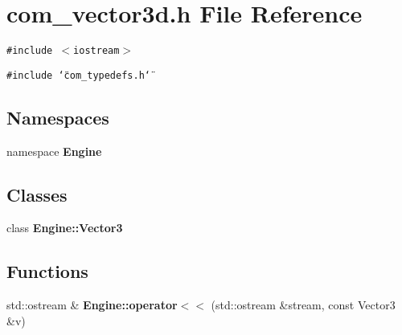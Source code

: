 \section{com\_\-vector3d.h File Reference}
\label{com__vector3d_8h}
{\tt \#include $<$iostream$>$}\par
{\tt \#include \char`\"{}com\_\-typedefs.h\char`\"{}}\par
\subsection*{Namespaces}
\begin{CompactItemize}
\item 
namespace {\bf Engine}
\end{CompactItemize}
\subsection*{Classes}
\begin{CompactItemize}
\item 
class {\bf Engine::Vector3}
\end{CompactItemize}
\subsection*{Functions}
\begin{CompactItemize}
\item 
std::ostream \& {\bf Engine::operator$<$$<$} (std::ostream \&stream, const Vector3 \&v)
\end{CompactItemize}

